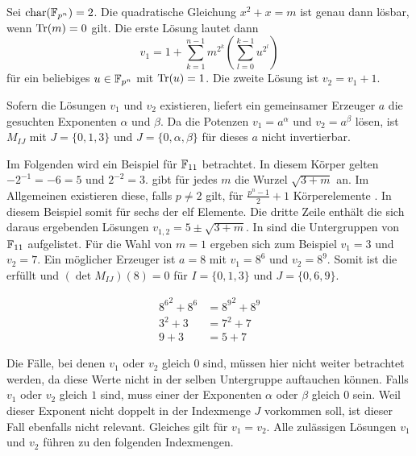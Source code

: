\begin{lemma}
    Sei $\charac(\field{p}[n]) = 2$. Die quadratische Gleichung $x^2 + x = m$ ist genau dann lösbar, wenn $\mathrm{Tr}(m) = 0$ gilt. Die erste Lösung lautet dann
    \begin{equation*}
        v_1 = 1 + \sum_{k=1}^{n-1} m^{2^k}(\sum_{l=0}^{k-1} u^{2^l})
    \end{equation*}
     für ein beliebiges $u \in \field{p}[n]$ mit $\mathrm{Tr}(u) = 1$. Die zweite Lösung ist $v_2 = v_1 + 1$.
\end{lemma}

Sofern die Lösungen $v_1$ und $v_2$ existieren, liefert ein gemeinsamer Erzeuger $a$ die gesuchten Exponenten $\alpha$ und $\beta$. Da die Potenzen $v_1 = a^\alpha$ und $v_2 = a^\beta$  lösen, ist $M_{IJ}$ mit $J = \{0,1,3\}$ und $J = \{0,\alpha,\beta\}$ für dieses $a$ nicht invertierbar.

\sloppy Im Folgenden wird ein Beispiel für $\field{11}$ betrachtet. In diesem Körper gelten ${-2^{-1} = -6 = 5}$ und $2^{-2} = 3$.  gibt für jedes $m$ die Wurzel $\sqrt{3 + m}$ an. Im Allgemeinen existieren diese, falls $p \neq 2$ gilt, für $\frac{p^n-1}{2} + 1$ Körperelemente \cite{RootsFiniteFields}. In diesem Beispiel somit für sechs der elf Elemente. Die dritte Zeile enthält die sich daraus ergebenden Lösungen $v_{1,2} = 5 \pm \sqrt{3+m}$.
In  sind die Untergruppen von $\field{11}$ aufgelistet. Für die Wahl von $m=1$ ergeben sich zum Beispiel $v_1 = 3$ und $v_2 = 7$. Ein möglicher Erzeuger ist $a = 8$ mit $v_1 = 8^6$ und $v_2 = 8^9$. Somit ist die  erfüllt und $(\det M_{IJ})(8) = 0$ für $I = \{0,1,3\}$ und $J = \{0,6,9\}$.

\begin{align*}
    {8^6}^2 + 8^6 &= {8^{9}}^2 + 8^9 \\
    3^2 + 3 &= 7^2 + 7 \\
    9 + 3 &= 5 + 7
\end{align*}

Die Fälle, bei denen $v_1$ oder $v_2$ gleich 0 sind, müssen hier nicht weiter betrachtet werden, da diese Werte nicht in der selben Untergruppe auftauchen können. Falls $v_1$ oder $v_2$ gleich $1$ sind, muss einer der Exponenten $\alpha$ oder $\beta$ gleich $0$ sein. Weil dieser Exponent nicht doppelt in der Indexmenge $J$ vorkommen soll, ist dieser Fall ebenfalls nicht relevant. Gleiches gilt für $v_1 = v_2$. Alle zulässigen Lösungen $v_1$ und $v_2$ führen zu den folgenden Indexmengen.

